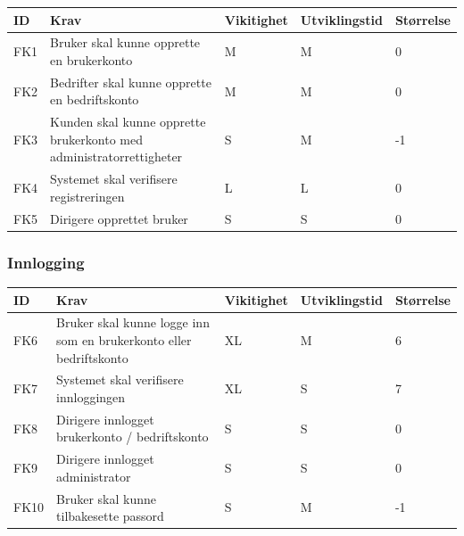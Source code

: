 \documentclass[12pt]{article}
\newcommand{\cello}{\cellcolor{orange!25}}
\newcommand{\celly}{\cellcolor{yellow!25}}
\newcommand{\cellg}{\cellcolor{green!25}}
\begin{document}
        \begin{tabular}{|p{2cm}|p{6cm}|
            >{\centering\arraybackslash}p{2cm}|
            >{\centering\arraybackslash}p{2cm}|
            >{\centering\arraybackslash}p{2cm}|} 
            \hline
            \bf ID & \bf Krav & \bf Vikitighet & \bf Utviklingstid & \bf Størrelse\\
            \hline
            FK1
            &
            Bruker skal kunne opprette en brukerkonto
            & M & M & \celly 0\\
            \hline
            FK2
            &
            Bedrifter skal kunne opprette en bedriftskonto
            & M & M & \celly 0\\
            \hline
            FK3
            &
            Kunden skal kunne opprette brukerkonto med administratorrettigheter
            & S & M & \cello -1\\
            \hline
            FK4
            &
            Systemet skal verifisere registreringen
            & L & L & \celly 0\\
            \hline
            FK5
            &
            Dirigere opprettet bruker
            & S & S & \celly 0\\ %
            \hline
        \end{tabular}
        
        \subsubsection{Innlogging}
        
        \begin{tabular}{|p{2cm}|p{6cm}|
            >{\centering\arraybackslash}p{2cm}|
            >{\centering\arraybackslash}p{2cm}|
            >{\centering\arraybackslash}p{2cm}|} 
            \hline
            \bf ID & \bf Krav & \bf Vikitighet & \bf Utviklingstid & \bf Størrelse\\
            \hline
            FK6
            &
            Bruker skal kunne logge inn som en brukerkonto eller bedriftskonto
            & XL & M & \cellg 6\\
            \hline
            FK7
            &
            Systemet skal verifisere innloggingen
            & XL & S & \cellg 7\\
            \hline
            FK8
            &
            Dirigere innlogget brukerkonto / bedriftskonto
            & S & S & \celly 0\\
            \hline
            FK9
            &
            Dirigere innlogget administrator
            & S & S & \celly 0\\
            \hline
            FK10
            &
            Bruker skal kunne tilbakesette passord
            & S & M & \cello -1\\
            \hline
        \end{tabular}
        
\end{document}
